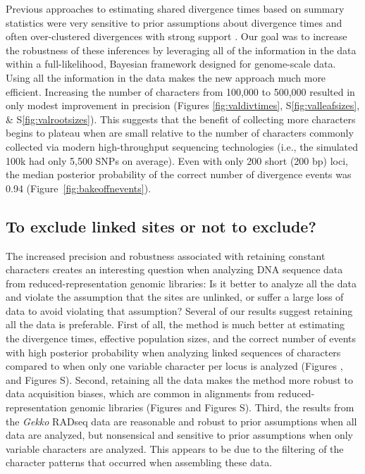 Previous approaches to estimating shared divergence times based on summary
statistics were very sensitive to prior assumptions about divergence times and
often over-clustered divergences with strong support
\citep{Oaks2012,Hickerson2013,Oaks2014reply,Oaks2014dpp}.
Our goal was to increase the robustness of these inferences by leveraging all
of the information in the data within a full-likelihood, Bayesian framework
designed for genome-scale data.
Using all the information in the data makes the new approach much
more efficient.
Increasing the number of characters from 100,000 to 500,000 resulted
in only modest improvement in precision
(Figures
\ref{fig:valdivtimes}, S\ref{fig:valleafsizes}, \& S\ref{fig:valrootsizes}).
This suggests that the benefit of collecting more characters begins to plateau
when \datasets are small relative to the number of characters commonly
collected via modern high-throughput sequencing technologies (i.e., the
simulated 100k \datasets had only 5,500 SNPs on average).
Even with only 200 short (200 bp) loci, the median posterior probability
of the correct number of divergence events was 0.94
(Figure~\ref{fig:bakeoffnevents}).


\subsection{To exclude linked sites or not to exclude?}

The increased precision and robustness associated with retaining constant
characters creates an interesting question when analyzing DNA sequence data
from reduced-representation genomic libraries:
Is it better to analyze all the data and violate the assumption that the sites
are unlinked, or suffer a large loss of data to avoid violating that
assumption?
Several of our results suggest retaining all the data is preferable.
First of all, the method is much better at estimating the divergence times,
effective population sizes, and the correct number of events with high
posterior probability when analyzing linked sequences of characters compared to
when only one variable character per locus is analyzed
(Figures
,
and
Figures
S).
Second, retaining all the data makes the method more robust to data acquisition
biases, which are common in alignments from reduced-representation genomic
libraries
(Figures
and
Figures
S).
Third, the results from the \emph{Gekko} RADseq data are
reasonable and robust to prior assumptions when all data are analyzed,
but nonsensical and sensitive to prior assumptions when only variable
characters are analyzed.
This appears to be due to the filtering of the character patterns that occurred
when assembling these data.

